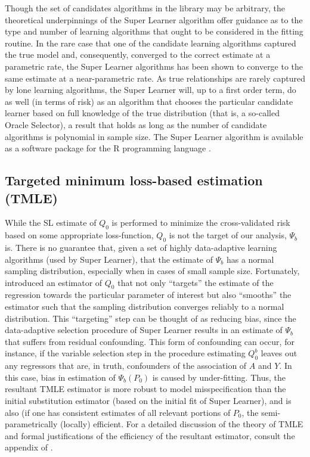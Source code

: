 Though the set of candidates algorithms in the library may be arbitrary, the
theoretical underpinnings of the Super Learner algorithm offer guidance as to
the type and number of learning algorithms that ought to be considered in the
fitting routine. In the rare case that one of the candidate learning algorithms
captured the true model and, consequently, converged to the correct estimate at
a parametric rate, the Super Learner algorithms has been shown to converge to
the same estimate at a near-parametric rate. As true relationships are rarely
captured by lone learning algorithms, the Super Learner will, up to a first
order term, do as well (in terms of risk) as an algorithm that chooses the
particular candidate learner based on full knowledge of the true distribution
(that is, a so-called Oracle Selector), a result that holds as long as the
number of candidate algorithms is polynomial in sample size. The Super Learner
algorithm is available as a software package \cite{van2007super} for the R
programming language \cite{R}.

\subsection{Targeted minimum loss-based estimation (TMLE)}\label{tmle}

While the SL estimate of $Q_0$ is performed to minimize the cross-validated
risk based on some appropriate loss-function, $Q_0$ is not the target of our
analysis,  $\Psi_b$ is. There is no guarantee that, given a set of highly
data-adaptive learning algorithms (used by Super Learner), that the estimate of
$\Psi_b$ has a normal sampling distribution, especially when in cases of small
sample size. Fortunately, \cite{van2011targeted} introduced an estimator of
$Q_0$ that not only ``targets'' the estimate of the regression towards the
particular parameter of interest but also ``smooths'' the estimator such that
the sampling distribution converges reliably to a normal distribution. This
``targeting'' step can be thought of as reducing bias, since the data-adaptive
selection procedure of Super Learner results in an estimate of $\Psi_b$ that
suffers from residual confounding. This form of confounding can occur, for
instance, if the variable selection step in the procedure estimating $Q^b_0$
leaves out any regressors that are, in truth, confounders of the association of
$A$ and $Y$. In this case, bias in estimation of $\Psi_b(P_0)$ is caused by
under-fitting.  Thus, the resultant TMLE estimator is more robust to model
misspecification than the initial substitution estimator (based on the initial
fit of Super Learner), and is also (if one has consistent estimates of all
relevant portions of $P_0$, the semi-parametrically (locally) efficient. For a
detailed discussion of the theory of TMLE and formal justifications of the
efficiency of the resultant estimator, consult the appendix of
\cite{van2011targeted}.

